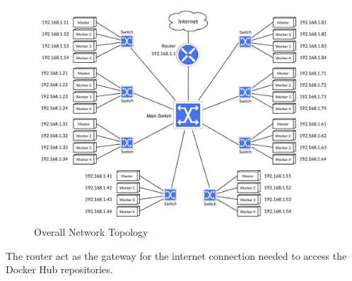 \begin{figure}[H]
    \centering
    \includegraphics[width=\textwidth]{figures/overall_topology}
    \caption{Overall Network Topology}
    \label{fig:topology_overall}
\end{figure}

\noindent 
The router act as the gateway for the internet connection needed to access the Docker Hub repositories. 